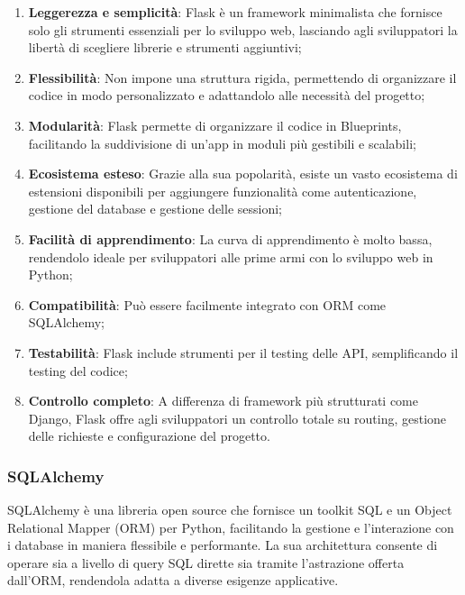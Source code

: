 \begin{enumerate}
    \item \textbf{Leggerezza e semplicità}: Flask è un framework minimalista che fornisce solo gli strumenti essenziali per lo sviluppo web, lasciando agli sviluppatori la libertà di scegliere librerie e strumenti aggiuntivi;
    \item \textbf{Flessibilità}: Non impone una struttura rigida, permettendo di organizzare il codice in modo personalizzato e adattandolo alle necessità del progetto;
    \item \textbf{Modularità}: Flask permette di organizzare il codice in Blueprints, facilitando la suddivisione di un'app in moduli più gestibili e scalabili;
    \item \textbf{Ecosistema esteso}: Grazie alla sua popolarità, esiste un vasto ecosistema di estensioni disponibili per aggiungere funzionalità come autenticazione, gestione del database e gestione delle sessioni;
    \item \textbf{Facilità di apprendimento}: La curva di apprendimento è molto bassa, rendendolo ideale per sviluppatori alle prime armi con lo sviluppo web in Python;
    \item \textbf{Compatibilità}: Può essere facilmente integrato con ORM come SQLAlchemy;
    \item \textbf{Testabilità}: Flask include strumenti per il testing delle API, semplificando il testing del codice;
    \item \textbf{Controllo completo}: A differenza di framework più strutturati come Django, Flask offre agli sviluppatori un controllo totale su routing, gestione delle richieste e configurazione del progetto.
\end{enumerate}

\subsubsection{SQLAlchemy}
\label{subsubsec:sqlalchemy}

SQLAlchemy è una libreria open source che fornisce un toolkit SQL e un Object Relational Mapper (ORM) per Python, facilitando la gestione e l'interazione con i database in maniera flessibile e performante. 
La sua architettura consente di operare sia a livello di query SQL dirette sia tramite l'astrazione offerta dall'ORM, rendendola adatta a diverse esigenze applicative.\\

